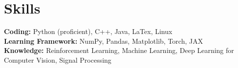 
\section{Skills}


\textbf{Coding:} Python (proficient), C++, Java, LaTex, Linux\\
\textbf{Learning Framework:} NumPy, Pandas, Matplotlib, Torch, JAX\\
\textbf{Knowledge:} Reinforcement Learning, Machine Learning, Deep Learning for Computer Vision, Signal Processing